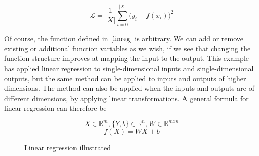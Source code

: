 \[
    \mathcal{L} = \frac{1}{|X|}\sum_{i = 0}^{|X|} \big(y_i - f(x_i)\big)^2 \tag{2.2} \label{func:mse}
\]

Of course, the function defined in $ \eqref{linreg} $ is arbitrary. 
We can add or remove existing or additional function variables as we wish,
if we see that changing the function structure improves at mapping the input to the output.
This example has applied linear regression to single-dimensional inputs and single-dimensional outputs,
but the same method can be applied to inputs and outputs of higher dimensions.
The method can also be applied when the inputs and outputs are of different dimensions, by applying linear transformations.
A general formula for linear regression can therefore be 



\[
    X \in \mathbb{R}^m, \{Y, b\} \in \mathbb{R}^n, W \in \mathbb{R}^{m x n}
\]
\[
    f(X) = WX + b \tag{2.3} \label{func:linearLayer}
\]
 

\begin{figure}
    \centering
    \qquad
    \caption{Linear regression illustrated}%
    \label{fig:linearRegression}%
\end{figure}



